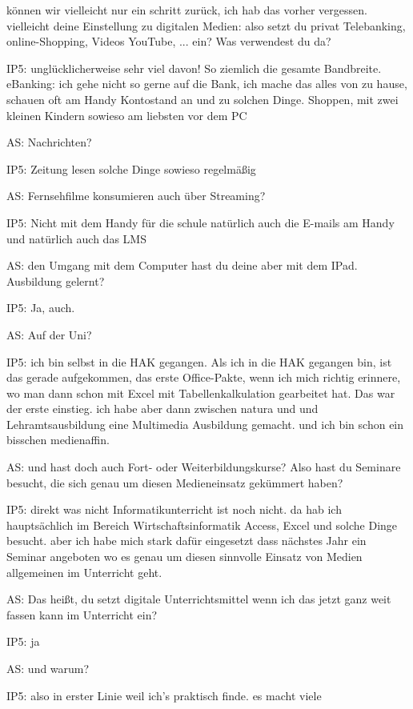 \documentclass[fontsize=11pt,paper=a4]{scrbook}
\begin{document}
{\begin{itemize*}
können wir vielleicht nur ein
schritt zurück, ich hab das vorher vergessen. vielleicht deine Einstellung
zu digitalen Medien: also setzt du privat Telebanking, online-Shopping, Videos
YouTube, ... ein? Was verwendest du da?
\item[IP5:]
 unglücklicherweise
sehr viel davon!
So ziemlich die gesamte Bandbreite. eBanking: ich gehe nicht so gerne auf die Bank, ich
mache das alles von zu hause, schauen oft
am Handy Kontostand an und  zu solchen Dinge. Shoppen, mit zwei kleinen Kindern sowieso am liebsten vor dem PC
\item[AS:] Nachrichten?
\item[IP5:] Zeitung lesen solche Dinge sowieso regelmäßig
\item[AS:] Fernsehfilme konsumieren
auch über Streaming?
\item[IP5:]
Nicht mit dem Handy
für die schule natürlich auch die
E-mails am Handy und natürlich auch das LMS
\item[AS:]
den Umgang
mit dem Computer hast du deine aber mit dem IPad.
Ausbildung gelernt?
\item[IP5:] Ja, auch.
\item[AS:] Auf der Uni?
\item[IP5:]ich bin
selbst in die HAK gegangen. Als ich in die HAK gegangen bin, ist das gerade aufgekommen, das erste Office-Pakte, wenn ich mich richtig erinnere, wo man dann schon mit
Excel mit Tabellenkalkulation gearbeitet hat. Das war der erste einstieg. 
ich habe aber dann zwischen natura und
und Lehramtsausbildung eine Multimedia
Ausbildung gemacht. und ich bin schon ein
bisschen medienaffin.
\item[AS:] 
 und hast doch auch Fort-
oder Weiterbildungskurse? Also hast du Seminare
besucht, die sich genau um diesen
Medieneinsatz gekümmert haben?
\item[IP5:] direkt was nicht Informatikunterricht
ist noch nicht. da hab ich hauptsächlich im
Bereich Wirtschaftsinformatik Access,
Excel und solche Dinge besucht. 
aber ich habe mich stark dafür
eingesetzt dass nächstes Jahr ein
Seminar angeboten
wo es genau um diesen sinnvolle Einsatz von Medien allgemeinen im Unterricht geht.
\item[AS:] Das heißt, du setzt digitale Unterrichtsmittel wenn
ich das jetzt ganz weit fassen kann im
Unterricht ein?
\item[IP5:] ja 
\item[AS:]und warum?
\item[IP5:] also in erster Linie weil
ich's praktisch finde. es macht viele

\end{itemize*}}
\end{document}
